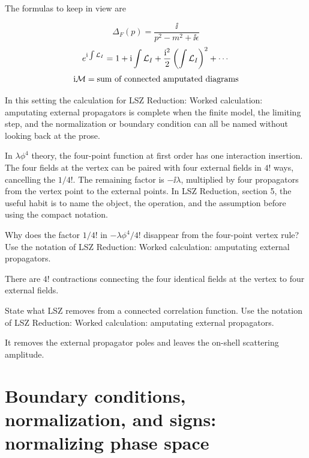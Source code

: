 The formulas to keep in view are

\[
  \Delta_F(p)=\frac{\ii}{p^2-m^2+\ii\epsilon}
\]
\[
  e^{\mathrm i\int\mathcal L_I}=1+\mathrm i\int\mathcal L_I+\frac{\mathrm i^2}{2}\left(\int\mathcal L_I\right)^2+\cdots
\]
\[
  \mathrm i\mathcal M=\hbox{sum of connected amputated diagrams}
\]

In this setting the calculation for LSZ Reduction: Worked calculation: amputating external propagators is complete when the finite model, the limiting step, and the normalization or boundary condition can all be named without looking back at the prose.




\begin{example}
In \(\lambda\phi^4\) theory, the four-point function at first order has one interaction insertion.  The four fields at the vertex can be paired with four external fields in \(4!\) ways, cancelling the \(1/4!\).  The remaining factor is \(-\ii\lambda\), multiplied by four propagators from the vertex point to the external points.  In LSZ Reduction, section 5, the useful habit is to name the object, the operation, and the assumption before using the compact notation.
\end{example}



\begin{exercise}
Why does the factor \(1/4!\) in \(-\lambda\phi^4/4!\) disappear from the four-point vertex rule?  Use the notation of LSZ Reduction: Worked calculation: amputating external propagators.
\begin{answer}
There are \(4!\) contractions connecting the four identical fields at the vertex to four external fields.
\end{answer}
\end{exercise}

\begin{exercise}
State what LSZ removes from a connected correlation function.  Use the notation of LSZ Reduction: Worked calculation: amputating external propagators.
\begin{answer}
It removes the external propagator poles and leaves the on-shell scattering amplitude.
\end{answer}
\end{exercise}



\section{Boundary conditions, normalization, and signs: normalizing phase space}

